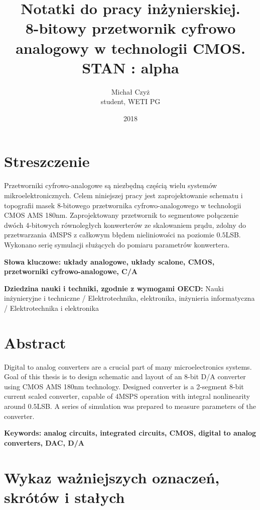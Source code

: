 \documentclass[10pt,a4paper,twoside]{report}
\title{Notatki do pracy inżynierskiej. \\ 8-bitowy przetwornik cyfrowo analogowy w technologii CMOS. \\ STAN : alpha}
\date{2018}
\author{Michał Czyż \\ student, WETI PG}
\theoremstyle{definition}
\theoremstyle{definition}
\theoremstyle{definition}
\theoremstyle{definition}
\theoremstyle{definition}
\begin{document}
	\setcounter{page}{3}
	\section*{Streszczenie}
	{	Przetworniki cyfrowo-analogowe są niezbędną częścią wielu systemów mikroelektronicznych. Celem niniejszej pracy jest zaprojektowanie schematu i topografii masek 8-bitowego przetwornika cyfrowo-analogowego w technologii CMOS AMS 180nm. Zaprojektowany przetwornik to segmentowe połączenie dwóch 4-bitowych równoległych konwerterów ze skalowaniem prądu, zdolny do przetwarzania $4$MSPS z całkowym błędem nieliniowości na poziomie $0.5$LSB. Wykonano serię symulacji służących do pomiaru parametrów konwertera.}
	
	{	\textbf{Słowa kluczowe: układy analogowe, układy scalone, CMOS, przetworniki cyfrowo-analogowe, C/A }}
	
	{	\textbf{Dziedzina nauki i techniki, zgodnie z wymogami OECD:} Nauki inżynieryjne i techniczne /  Elektrotechnika, elektronika, inżynieria informatyczna /  Elektrotechnika i elektronika}
	
	\newpage
	
	\section*{Abstract}
	{	Digital to analog converters are a crucial part of many microelectronics systems. Goal of this thesis is to design schematic and layout of an 8-bit D/A converter using CMOS AMS 180nm technology. Designed converter is a 2-segment 8-bit current scaled converter, capable of $4$MSPS operation with integral nonlinearity around $0.5$LSB. A series of simulation was prepared to measure parameters of the converter.}
	
	{	\textbf{Keywords: analog circuits, integrated circuits, CMOS, digital to analog converters, DAC, D/A}}
	
	{
	\tableofcontents
	\par
	}
	\newpage


	\section*{Wykaz ważniejszych oznaczeń, skrótów i stałych}
	\label{sec:skroty}
\end{document}
